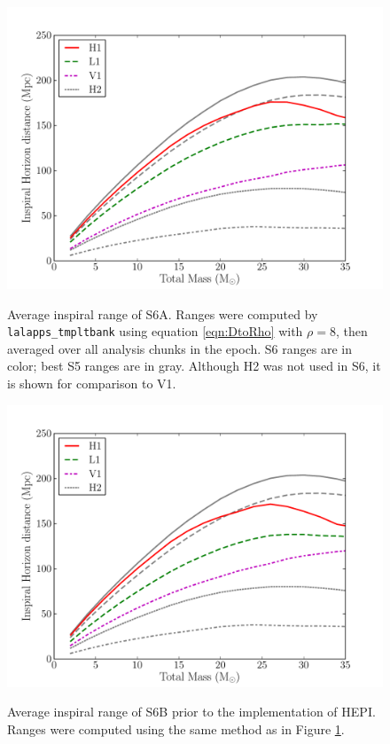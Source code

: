 \begin{figure}[p]
\begin{center}
\label{fig:s6a_insprange}
\includegraphics[width=6in]{figures/s6a_insprange.pdf}
\end{center}
\caption{Average inspiral range of S6A. Ranges were computed by \texttt{lalapps\_tmpltbank} using equation \ref{eqn:DtoRho} with $\rho=8$, then averaged over all analysis chunks in the epoch. S6 ranges are in color; best S5 ranges are in gray. Although H2 was not used in \ac{S6}, it is shown for comparison to V1.}
\end{figure}

\begin{figure}[p]
\begin{center}
\label{fig:s6b_pre-hepi_insprange}
\includegraphics[width=6in]{figures/s6b_pre-hepi_insprange.pdf}
\end{center}
\caption{Average inspiral range of S6B prior to the implementation of \ac{HEPI}. Ranges were computed using the same method as in Figure \ref{fig:s6a_insprange}.}
\end{figure}

